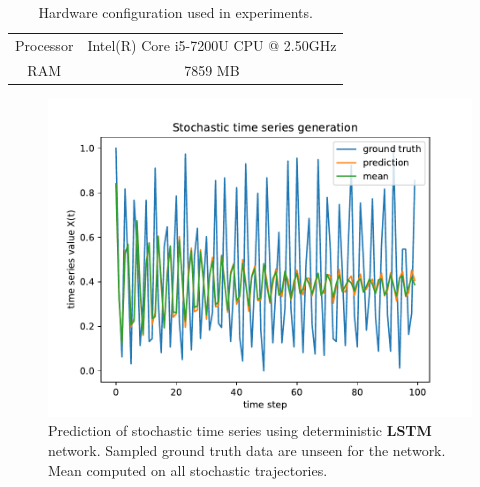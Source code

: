 \begin{table}
    \centering
    \begin{tabular}{cc}
        Processor & Intel(R) Core i5-7200U CPU @ 2.50GHz \\
        RAM       & 7859 MB                              \\
    \end{tabular}
    \caption{Hardware configuration used in experiments.}
    \label{tab:hardware}
\end{table}

\begin{figure}
    \centering
    \includegraphics[width=\textwidth]{figures/nn_limitation.pdf}
    \caption{Prediction of stochastic time series using deterministic
        \textbf{LSTM} network. Sampled ground truth data are unseen for the network.
        Mean computed on all stochastic trajectories.}
    \label{fig:nn_limitation}
\end{figure}
